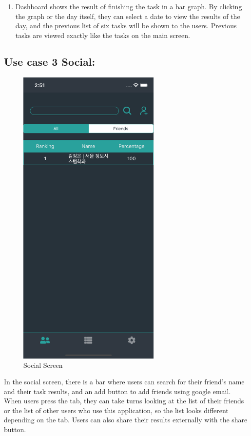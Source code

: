 \documentclass[conference]{IEEEtran}
\begin{document}
\begin{enumerate}
    \item Dashboard shows the result of finishing the task in a bar graph. By clicking the graph or the day itself, they can select a date to view the results of the day, and the previous list of six tasks will be shown to the users. Previous tasks are viewed exactly like the tasks on the main screen.

\end{enumerate}

\subsection{Use case 3 Social:}

\begin{figure}[htp] \centering \includegraphics[width=200pt]{Social Screen최종.png} \caption{Social Screen} \label{fig:Social Screen} \end{figure}

In the social screen, there is a bar where users can search for their friend's name and their task results, and an add button to add friends using google email. When users press the tab, they can take turns looking at the list of their friends or the list of other users who use this application, so the list looks different depending on the tab. Users can also share their results externally with the share button.
\end{document}
